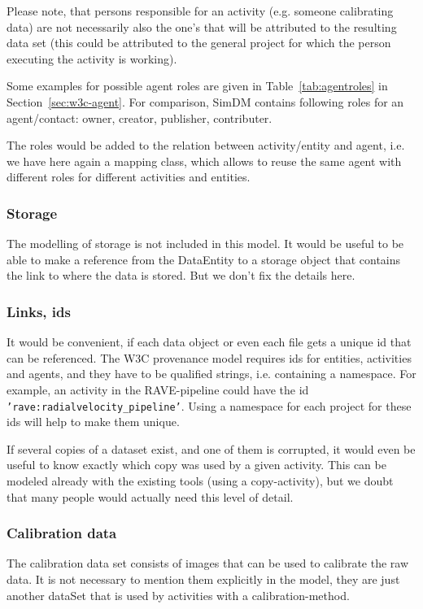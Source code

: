 Please note, that persons responsible for an activity (e.g. someone calibrating data) are not necessarily also the one's that will be attributed to the resulting data set (this could 
be attributed to the general project for which the person executing the activity is working).

Some examples for possible agent roles are given in Table~\ref{tab:agentroles}
in Section~\ref{sec:w3c-agent}. For comparison, SimDM contains following roles for 
an agent/contact: owner, creator, publisher, contributer.

The roles would be added to the relation between activity/entity and agent, 
i.e. we have here again a mapping class, which allows to reuse the same agent 
with different roles for different activities and entities.


\subsubsection{Storage}
The modelling of storage is not included in this model. 
It would be useful to be able to make a reference from the DataEntity to a storage
object that contains the link to where the data is stored. But we don't fix the 
details here.


\subsubsection{Links, ids}\label{sec:links_between_data}
It would be convenient, if each data object or even each file 
gets a unique id that can be referenced. The W3C provenance model requires ids
for entities, activities and agents, and they have to be qualified strings, 
i.e. containing a namespace. For example, an activity in the RAVE-pipeline could 
have the id \texttt{'rave:radialvelocity\_pipeline'}. Using a namespace for each 
project for these ids will help to make them unique. 

If several copies of a dataset exist, and one of them is corrupted, it would even be useful to know
exactly which copy was used by a given activity. This can be modeled already 
with the existing tools (using a copy-activity), but we doubt that many people
would actually need this level of detail.



\subsubsection{Calibration data}
The calibration data set consists of images that can be used to calibrate the
raw data. It is not necessary to mention them explicitly in the model, 
they are just another dataSet that is used by activities with a 
calibration-method.


